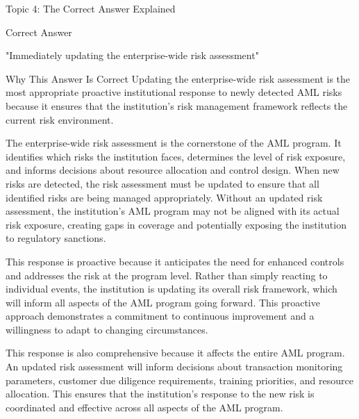 \documentclass[8pt]{beamer}  %
\newcommand{\correct}{\textcolor{correctgreen}{\ding{51}}}
\begin{document}
	\begin{frame}{Topic 4: The Correct Answer Explained}
		\begin{block}{\large \correct \textcolor{correctgreen}{Correct Answer}}
			\begin{center}
				\Large "Immediately updating the enterprise-wide risk assessment"
			\end{center}
		\end{block}
		
		\vspace{0.2cm}
		\begin{block}{\large Why This Answer Is Correct}
			Updating the enterprise-wide risk assessment is the most appropriate proactive institutional response to newly detected AML risks because it ensures that the institution's risk management framework reflects the current risk environment.
			
			The enterprise-wide risk assessment is the cornerstone of the AML program. It identifies which risks the institution faces, determines the level of risk exposure, and informs decisions about resource allocation and control design. When new risks are detected, the risk assessment must be updated to ensure that all identified risks are being managed appropriately. Without an updated risk assessment, the institution's AML program may not be aligned with its actual risk exposure, creating gaps in coverage and potentially exposing the institution to regulatory sanctions.
			
			This response is proactive because it anticipates the need for enhanced controls and addresses the risk at the program level. Rather than simply reacting to individual events, the institution is updating its overall risk framework, which will inform all aspects of the AML program going forward. This proactive approach demonstrates a commitment to continuous improvement and a willingness to adapt to changing circumstances.
			
			This response is also comprehensive because it affects the entire AML program. An updated risk assessment will inform decisions about transaction monitoring parameters, customer due diligence requirements, training priorities, and resource allocation. This ensures that the institution's response to the new risk is coordinated and effective across all aspects of the AML program.
			

\end{block}
\end{frame}
\end{document}
